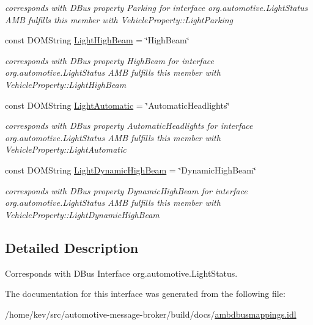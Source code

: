 \begin{DoxyCompactItemize}
\begin{DoxyCompactList}\small\item\em corresponds with D\+Bus property Parking for interface org.\+automotive.\+Light\+Status A\+M\+B fulfills this member with Vehicle\+Property\+::\+Light\+Parking \end{DoxyCompactList}\item 
\hypertarget{interfaceLightStatus_a667ffacdff37d7c6cc804bd5f2a2acd8}{const D\+O\+M\+String \hyperlink{interfaceLightStatus_a667ffacdff37d7c6cc804bd5f2a2acd8}{Light\+High\+Beam} = \char`\"{}High\+Beam\char`\"{}}\label{interfaceLightStatus_a667ffacdff37d7c6cc804bd5f2a2acd8}

\begin{DoxyCompactList}\small\item\em corresponds with D\+Bus property High\+Beam for interface org.\+automotive.\+Light\+Status A\+M\+B fulfills this member with Vehicle\+Property\+::\+Light\+High\+Beam \end{DoxyCompactList}\item 
\hypertarget{interfaceLightStatus_a64b15aee59cbc2e5d75644edbbfb8bc0}{const D\+O\+M\+String \hyperlink{interfaceLightStatus_a64b15aee59cbc2e5d75644edbbfb8bc0}{Light\+Automatic} = \char`\"{}Automatic\+Headlights\char`\"{}}\label{interfaceLightStatus_a64b15aee59cbc2e5d75644edbbfb8bc0}

\begin{DoxyCompactList}\small\item\em corresponds with D\+Bus property Automatic\+Headlights for interface org.\+automotive.\+Light\+Status A\+M\+B fulfills this member with Vehicle\+Property\+::\+Light\+Automatic \end{DoxyCompactList}\item 
\hypertarget{interfaceLightStatus_a401770a27e1e511566d5eaa893a24736}{const D\+O\+M\+String \hyperlink{interfaceLightStatus_a401770a27e1e511566d5eaa893a24736}{Light\+Dynamic\+High\+Beam} = \char`\"{}Dynamic\+High\+Beam\char`\"{}}\label{interfaceLightStatus_a401770a27e1e511566d5eaa893a24736}

\begin{DoxyCompactList}\small\item\em corresponds with D\+Bus property Dynamic\+High\+Beam for interface org.\+automotive.\+Light\+Status A\+M\+B fulfills this member with Vehicle\+Property\+::\+Light\+Dynamic\+High\+Beam \end{DoxyCompactList}\end{DoxyCompactItemize}


\subsection{Detailed Description}
Corresponds with D\+Bus Interface org.\+automotive.\+Light\+Status. 

The documentation for this interface was generated from the following file\+:\begin{DoxyCompactItemize}
\item 
/home/kev/src/automotive-\/message-\/broker/build/docs/\hyperlink{ambdbusmappings_8idl}{ambdbusmappings.\+idl}\end{DoxyCompactItemize}
